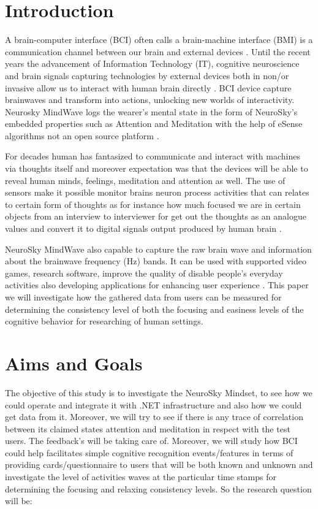 \documentclass{bioinfo}
\begin{document}
\section{Introduction}

A brain-computer interface (BCI) often calls a brain-machine interface (BMI) is a communication channel between our brain and external devices \citep{wolpaw}. Until the recent years the advancement of Information Technology (IT), cognitive neuroscience and brain signals capturing technologies by external devices both in non/or invasive allow us to interact with human brain directly \citep{wijayasekara}. BCI device capture brainwaves and transform into actions, unlocking new worlds of interactivity. Neurosky  MindWave logs the wearer’s mental state in the form of NeuroSky's embedded properties such as Attention and Meditation with the help of eSense algorithms not an open source platform \citep{larsen}. 

For decades human has fantasized to communicate and interact with machines via thoughts itself and moreover expectation was that the devices will be able to reveal human minds, feelings, meditation and attention as well.
The use of sensors make it possible monitor brains neuron process activities that can relates to certain form of thoughts as for instance how much focused we are in certain objects from an interview to interviewer for get out the thoughts as an analogue values and convert it to digital signals output produced by human brain \citep{Nijholt}.

NeuroSky MindWave also capable to capture the raw brain wave and information about the brainwave frequency (Hz) bands. It can be used with supported video games, research software, improve the quality of disable people's everyday activities also developing applications for enhancing user experience \citep{NeuroSky}. This paper we will investigate how the gathered data from users can be measured for determining the consistency level of both the focusing and easiness levels of the cognitive behavior for researching of human settings.


\section{Aims and Goals}
The objective of this study is to investigate the NeuroSky Mindset, to see how we could operate and integrate it with .NET infrastructure and also how we could get data from it. Moreover, we will try to see if there is any trace of correlation between its claimed states attention and meditation in respect with the test users. The feedback's will be taking care of. Moreover, we will study how BCI could help facilitates simple cognitive recognition events/features in terms of providing cards/questionnaire to users that will be both known and unknown and investigate the level of activities waves at the particular time stamps for determining the focusing and relaxing consistency levels. So the research question will be:\\
\end{document}
